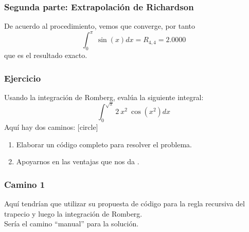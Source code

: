 \begin{frame}
\frametitle{Segunda parte: Extrapolación de Richardson}
De acuerdo al procedimiento, vemos que converge, por tanto 
\[ \int_{0}^{\pi} \: \sin(x) dx = R_{4, 4}= 2.0000 \]
que es el resultado exacto.
\end{frame}
\begin{frame}
\frametitle{Ejercicio}
Usando la integración de Romberg, evalúa la siguiente integral:
\[ \int_{0}^{\sqrt{\pi}} 2 \: x^{2} \:  \cos(x^{2}) dx\]
\pause
Aquí hay dos caminos:
[circle]
\begin{enumerate}[<+->]
\item Elaborar un código completo para resolver el problema.
\item Apoyarnos en las ventajas que nos da \python.
\end{enumerate}
\end{frame}
\begin{frame}
\frametitle{Camino 1}
Aquí tendrían que utilizar su propuesta de código para la regla recursiva del trapecio y luego la integración de Romberg.
\\
\bigskip
Sería el camino \enquote{manual} para la solución.
\end{frame}


